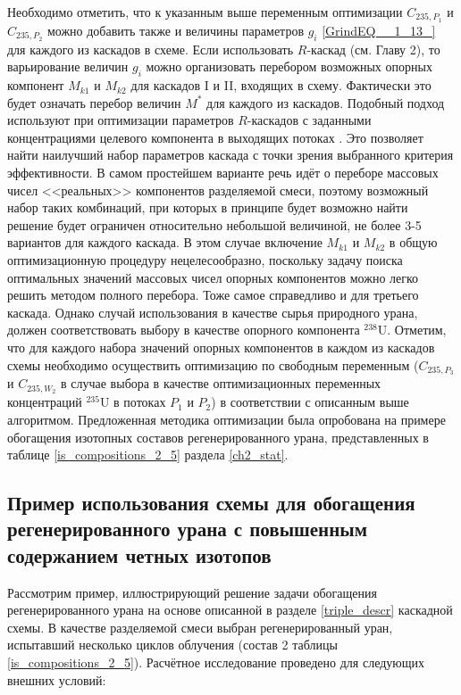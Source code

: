 Необходимо отметить, что к указанным выше переменным оптимизации $C_{235,{P_1}}$ и $C_{235,{P_2}}$ можно добавить также и величины параметров $g_{i}$  \ref{GrindEQ__1_13_} для каждого из каскадов в схеме. Если использовать $R$-каскад (см. Главу 2), то варьирование величин $g_{i}$ можно организовать перебором возможных опорных компонент $M_{k1}$ и $M_{k2}$ для каскадов I и II, входящих в схему. Фактически это будет означать перебор величин $M^{*}$ для каждого из каскадов. Подобный подход используют при оптимизации параметров $R$-каскадов с заданными концентрациями целевого компонента в выходящих потоках \cite{songComparativeStudyModel2010, sulaberidzeSravnenieOptimalnyhModelnyh2008}. Это позволяет найти наилучший набор параметров каскада с точки зрения выбранного критерия эффективности. В самом простейшем варианте речь идёт о переборе массовых чисел <<реальных>> компонентов разделяемой смеси, поэтому возможный набор таких комбинаций, при которых в принципе будет возможно найти решение будет ограничен относительно небольшой величиной, не более 3-5 вариантов для каждого каскада. В этом случае включение $M_{k1}$ и $M_{k2}$ в общую оптимизационную процедуру нецелесообразно, поскольку задачу поиска оптимальных значений массовых чисел опорных компонентов можно легко решить методом полного перебора. Тоже самое справедливо и для третьего каскада.
Однако случай использования в качестве сырья природного урана, должен соответствовать выбору в качестве опорного компонента $^{238}$U. Отметим, что для каждого набора значений опорных компонентов в каждом из каскадов схемы необходимо осуществить оптимизацию по свободным переменным ($C_{235,P_3}$ и $C_{235,W_2}$ в случае выбора в качестве оптимизационных переменных концентраций $^{235}$U в потоках $P_1$ и $P_2$) в соответствии с описанным выше алгоритмом. 
Предложенная методика оптимизации была опробована на примере обогащения изотопных составов регенерированного урана, представленных в таблице \ref{is_compositions_2_5} раздела \ref{ch2_stat}.

\subsection{Пример использования схемы для обогащения регенерированного урана с повышенным содержанием четных изотопов}\label{example_trip}

Рассмотрим пример, иллюстрирующий решение задачи обогащения регенерированного урана на основе описанной в разделе \ref{triple_descr} каскадной схемы. В качестве разделяемой смеси выбран регенерированный уран, испытавший несколько циклов облучения (состав 2 таблицы \ref{is_compositions_2_5}). Расчётное исследование проведено для следующих внешних условий:


